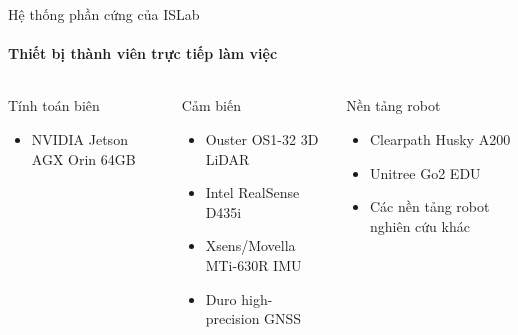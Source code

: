\documentclass[aspectratio=169,10pt]{beamer}
\begin{document}
\begin{frame}{Hệ thống phần cứng của ISLab}
  \framesubtitle{Thiết bị thành viên trực tiếp làm việc}
  \begin{columns}[T,onlytextwidth]
      \begin{block}{Tính toán biên}
        \begin{itemize}\small
          \item NVIDIA Jetson AGX Orin 64GB
        \end{itemize}
      \end{block}
      \begin{block}{Cảm biến}
        \begin{itemize}\small
          \item Ouster OS1-32 3D LiDAR
          \item Intel RealSense D435i
          \item Xsens/Movella MTi-630R IMU
          \item Duro high-precision GNSS
        \end{itemize}
      \end{block}
      \begin{block}{Nền tảng robot}
        \begin{itemize}\small
          \item Clearpath Husky A200
          \item Unitree Go2 EDU
          \item Các nền tảng robot nghiên cứu khác
        \end{itemize}
      \end{block}
  \end{columns}
\end{frame}

\end{document}
